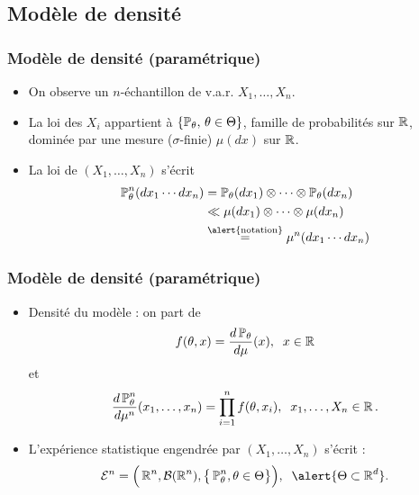 \subsection{Modèle de densité}

\begin{frame}
\frametitle{Modèle de densité (paramétrique)}
\begin{itemize}
\item On observe un $n$-échantillon de v.a.r. $X_1,\ldots, X_n$.
\item La loi des $X_i$ appartient à
$\{\operatorname{{\mathbb P}}_\theta,\,\theta \in \Theta\}$, famille de \alert{probabilités sur $\operatorname{{\mathbb R}}$}, \alert{dominée} par une mesure ($\sigma$-finie) $\mu(dx)$ sur $\operatorname{{\mathbb R}}$.
\item La loi de $(X_1,\ldots,X_n)$ s'écrit
\begin{align*}
\PP_\theta^n(dx_1\cdots dx_n) & = \PP_\theta(dx_1)\otimes \cdots \otimes \PP_\theta(dx_n) \\
& \ll  \mu(dx_1)\otimes \cdots \otimes \mu(dx_n) \\
& \stackrel{\text{\alert{notation}}}{=} \mu^n(dx_1\cdots dx_n)
\end{align*}
\end{itemize}
\end{frame}

\begin{frame}
\frametitle{Modèle de densité (paramétrique)}
\begin{itemize}
\item \alert{Densité du modèle} : on part de
$$f(\theta,x)=\frac{d\operatorname{{\mathbb P}}_\theta}{d\mu}(x),\;\;x\in \operatorname{{\mathbb R}}$$
et
$$\frac{d\operatorname{{\mathbb P}}_\theta^n}{d\mu^{n}}(x_1,\ldots, x_n) = \prod_{i = 1}^n f(\theta,x_i),\;\;x_1,\ldots, X_n \in \operatorname{{\mathbb R}}.$$
\item  \alert{L'expérience statistique} engendrée par $(X_1,\ldots, X_n)$ s'écrit :
$${\mathcal E}^n = \Big(\R^n, {\mathcal B}(\R^n), \big\{\PP_\theta^n,\theta \in \Theta\big\}\Big),\;\;\alert{\Theta \subset \R^d}.$$
\end{itemize}
\end{frame}

